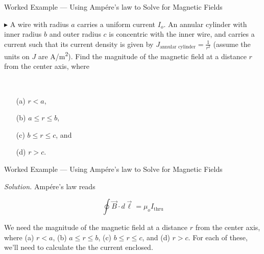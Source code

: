 \documentclass{beamer}
\begin{document}
\begin{frame}{Worked Example --- Using Amp{\'e}re's law to Solve for Magnetic Fields}

$\blacktriangleright$ A wire with radius $a$ carries a uniform current $I_o$. An annular cylinder with inner radius $b$ and outer radius $c$ is concentric with the inner wire, and carries a current such that its current density is given by $J_{\text{annular cylinder}} = \frac{1}{r^2}$ (assume the units on $J$ are \si{\ampere/\metre^2}). Find the magnitude of the magnetic field at a distance $r$ from the center axis, where

\begin{minipage}{0.4\textwidth}
\begin{flushleft}
\begin{figure}[H]
\centering
{}
\end{figure}
\end{flushleft}
\end{minipage}
~
\begin{minipage}{0.4\textwidth}
\begin{flushright}
\begin{enumerate}
    \item[(a)] $r < a$,
    \item[(b)] $a \leqslant r \leqslant b$,
    \item[(c)] $b \leqslant r \leqslant c$, and
    \item[(d)] $r > c$.
\end{enumerate}
\end{flushright}
\end{minipage}
\end{frame}

\begin{frame}{Worked Example --- Using Amp{\'e}re's law to Solve for Magnetic Fields}

\textit{Solution.} Amp{\'e}re's law reads

\begin{equation*}
    \oint \vec{B} \cdot d\vec{\ell} = \mu_o I_{\text{thru}}
\end{equation*}

We need the magnitude of the magnetic field at a distance $r$ from the center axis, where (a) $r < a$, (b) $a \leqslant r \leqslant b$, (c) $b \leqslant r \leqslant c$, and (d) $r > c$. For each of these, we'll need to calculate the the current enclosed.

\end{frame}
\end{document}
